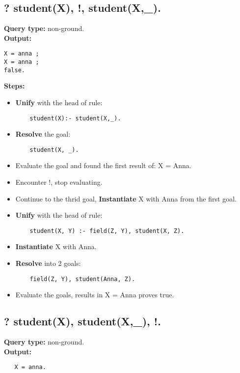 \subsection{? student(X), !, student(X,\_). } 
\textbf{Query type: } non-ground. \\
\textbf{Output:} 
\begin{lstlisting}
X = anna ;
X = anna ;
false.
\end{lstlisting}
\textbf{Steps:}
\begin{itemize}
    \item \textbf{Unify} with the head of rule:
    \begin{lstlisting}
    student(X):- student(X,_).
    \end{lstlisting}
    \item \textbf{Resolve} the goal:
    \begin{lstlisting}
    student(X, _).
    \end{lstlisting}
\item Evaluate the goal and found the first result of: X = Anna.
\item Encounter !, stop evaluating.
\item Continue to the thrid goal, \textbf{Instantiate} X with Anna from the first goal.
\item \textbf{Unify} with the head of rule:
    \begin{lstlisting}
    student(X, Y) :- field(Z, Y), student(X, Z).
    \end{lstlisting}
\item \textbf{Instantiate} X with Anna.
\item \textbf{Resolve} into 2 goals:
    \begin{lstlisting}
    field(Z, Y), student(Anna, Z).
    \end{lstlisting}
\item Evaluate the goals, results in X = Anna proves true.
\end{itemize}

\subsection{? student(X), student(X,\_), !.}
\textbf{Query type: } non-ground. \\
\textbf{Output:} 
\begin{lstlisting}
   X = anna. 
\end{lstlisting}

